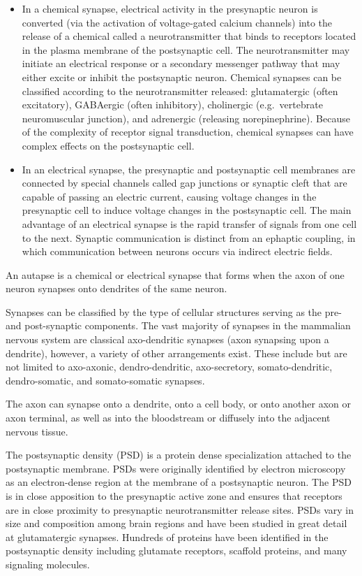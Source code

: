 \begin{itemize}
\tightlist
\item
  In a chemical synapse, electrical activity in the presynaptic neuron is converted (via the activation of voltage-gated calcium channels) into the release of a chemical called a neurotransmitter that binds to receptors located in the plasma membrane of the postsynaptic cell. The neurotransmitter may initiate an electrical response or a secondary messenger pathway that may either excite or inhibit the postsynaptic neuron. Chemical synapses can be classified according to the neurotransmitter released: glutamatergic (often excitatory), GABAergic (often inhibitory), cholinergic (e.g.~vertebrate neuromuscular junction), and adrenergic (releasing norepinephrine). Because of the complexity of receptor signal transduction, chemical synapses can have complex effects on the postsynaptic cell.
\item
  In an electrical synapse, the presynaptic and postsynaptic cell membranes are connected by special channels called gap junctions or synaptic cleft that are capable of passing an electric current, causing voltage changes in the presynaptic cell to induce voltage changes in the postsynaptic cell. The main advantage of an electrical synapse is the rapid transfer of signals from one cell to the next.
  Synaptic communication is distinct from an ephaptic coupling, in which communication between neurons occurs via indirect electric fields.
\end{itemize}

An autapse is a chemical or electrical synapse that forms when the axon of one neuron synapses onto dendrites of the same neuron.

Synapses can be classified by the type of cellular structures serving as the pre- and post-synaptic components. The vast majority of synapses in the mammalian nervous system are classical axo-dendritic synapses (axon synapsing upon a dendrite), however, a variety of other arrangements exist. These include but are not limited to axo-axonic, dendro-dendritic, axo-secretory, somato-dendritic, dendro-somatic, and somato-somatic synapses.

The axon can synapse onto a dendrite, onto a cell body, or onto another axon or axon terminal, as well as into the bloodstream or diffusely into the adjacent nervous tissue.

The postsynaptic density (PSD) is a protein dense specialization attached to the postsynaptic membrane. PSDs were originally identified by electron microscopy as an electron-dense region at the membrane of a postsynaptic neuron. The PSD is in close apposition to the presynaptic active zone and ensures that receptors are in close proximity to presynaptic neurotransmitter release sites. PSDs vary in size and composition among brain regions and have been studied in great detail at glutamatergic synapses. Hundreds of proteins have been identified in the postsynaptic density including glutamate receptors, scaffold proteins, and many signaling molecules.

